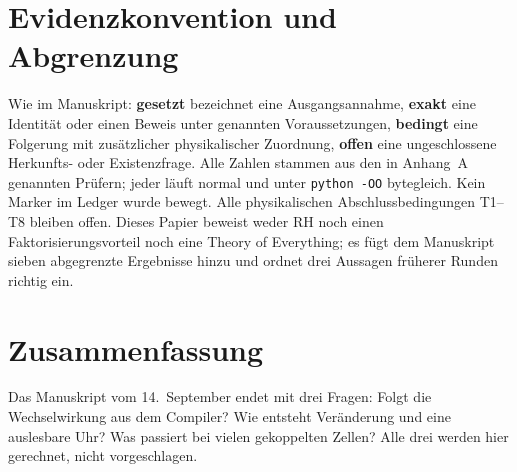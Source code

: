 
\maketitle

\section*{Evidenzkonvention und Abgrenzung}
Wie im Manuskript: \textbf{gesetzt} bezeichnet eine Ausgangsannahme, \textbf{exakt} eine Identität oder einen Beweis unter genannten Voraussetzungen, \textbf{bedingt} eine Folgerung mit zusätzlicher physikalischer Zuordnung, \textbf{offen} eine ungeschlossene Herkunfts- oder Existenzfrage. Alle Zahlen stammen aus den in Anhang~A genannten Prüfern; jeder läuft normal und unter \texttt{python -OO} bytegleich. Kein Marker im Ledger wurde bewegt. Alle physikalischen Abschlussbedingungen T1--T8 bleiben offen. Dieses Papier beweist weder RH noch einen Faktorisierungsvorteil noch eine Theory of Everything; es fügt dem Manuskript sieben abgegrenzte Ergebnisse hinzu und ordnet drei Aussagen früherer Runden richtig ein.

\section{Zusammenfassung}
Das Manuskript vom 14.\ September endet mit drei Fragen: Folgt die Wechselwirkung aus dem Compiler? Wie entsteht Veränderung und eine auslesbare Uhr? Was passiert bei vielen gekoppelten Zellen? Alle drei werden hier gerechnet, nicht vorgeschlagen.

